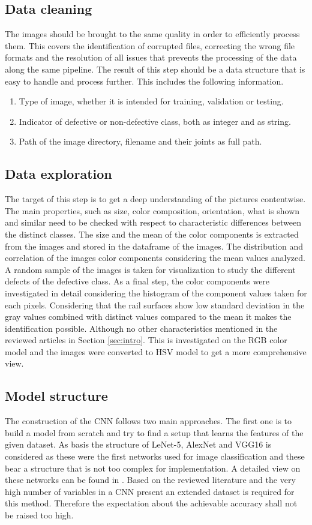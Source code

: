 \documentclass[10pt, final]{article}
\begin{document}
\subsection{Data cleaning}
The images should be brought to the same quality in order to efficiently process them.
This covers the identification of corrupted files, correcting the wrong file formats
and the resolution of all issues that prevents the processing of the data along the same pipeline.
The result of this step should be a data structure that is easy to handle and process further.
This includes the following information.
\begin{enumerate}
	\item Type of image, whether it is intended for training, validation or testing.
	\item Indicator of defective or non-defective class, both as integer and as string.
	\item Path of the image directory, filename and their joints as full path.
\end{enumerate}

\subsection{Data exploration}
The target of this step is to get a deep understanding of the pictures contentwise.
The main properties, such as size, color composition, orientation, what is shown and similar need to be
checked with respect to characteristic differences between the distinct classes.
The size and the mean of the color components is extracted from the images and stored in the dataframe
of the images.
The distribution and correlation of the images color components considering the mean values analyzed.
A random sample of the images is taken for visualization to study the different defects of the defective class.
As a final step, the color components were investigated in detail considering the histogram of the component
values taken for each pixels.
Considering that the rail surfaces show low standard deviation in the gray values combined with distinct
values compared to the mean it makes the identification possible.
Although no other characteristics mentioned in the reviewed articles in Section \ref{sec:intro}.
This is investigated on the RGB color model and the images were converted to HSV model to get a more
comprehensive view.

\subsection{Model structure}
The construction of the CNN follows two main approaches.
The first one is to build a model from scratch and try to find a setup that learns the features of the given
dataset.
As basis the structure of LeNet-5, AlexNet and VGG16 is considered as these were the first networks used for image
classification and these bear a structure that is not too complex for implementation.
A detailed view on these networks can be found in \cite{karim_illustrated_2022}.
Based on the reviewed literature and the very high number of variables in a CNN present an extended dataset is
required for this method.
Therefore the expectation about the achievable accuracy shall not be raised too high.
\end{document}
